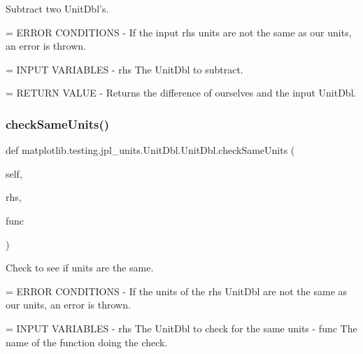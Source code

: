 \begin{DoxyVerb}Subtract two UnitDbl's.

= ERROR CONDITIONS
- If the input rhs units are not the same as our units,
  an error is thrown.

= INPUT VARIABLES
- rhs     The UnitDbl to subtract.

= RETURN VALUE
- Returns the difference of ourselves and the input UnitDbl.
\end{DoxyVerb}
 \mbox{\label{classmatplotlib_1_1testing_1_1jpl__units_1_1UnitDbl_1_1UnitDbl_af05536ec5446cfd426a8032eaa31ac93}} 
\subsubsection{\texorpdfstring{check\+Same\+Units()}{checkSameUnits()}}
{\footnotesize\ttfamily def matplotlib.\+testing.\+jpl\+\_\+units.\+Unit\+Dbl.\+Unit\+Dbl.\+check\+Same\+Units (\begin{DoxyParamCaption}\item[{}]{self,  }\item[{}]{rhs,  }\item[{}]{func }\end{DoxyParamCaption})}

\begin{DoxyVerb}Check to see if units are the same.

= ERROR CONDITIONS
- If the units of the rhs UnitDbl are not the same as our units,
  an error is thrown.

= INPUT VARIABLES
- rhs     The UnitDbl to check for the same units
- func    The name of the function doing the check.
\end{DoxyVerb}
 \mbox{\label{classmatplotlib_1_1testing_1_1jpl__units_1_1UnitDbl_1_1UnitDbl_a7f709d800f1bbf7260a4763ed0c8ef59}} 
